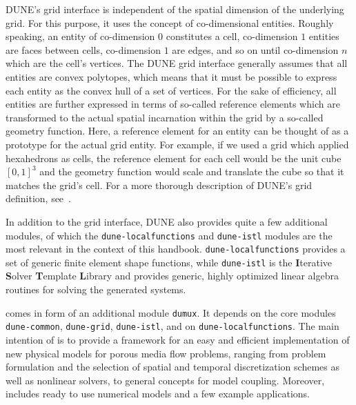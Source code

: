 DUNE's grid interface is independent of the spatial dimension of the
underlying grid. For this purpose, it uses the concept of
co-dimensional entities. Roughly speaking, an entity of co-dimension
$0$ constitutes a cell, co-dimension $1$ entities are faces between
cells, co-dimension $1$ are edges, and so on until co-dimension $n$
which are the cell's vertices.  The DUNE grid interface generally
assumes that all entities are convex polytopes, which means that it
must be possible to express each entity as the convex hull of a set of
vertices. For the sake of efficiency, all entities are further expressed in terms
of so-called reference elements which are transformed to the actual
spatial incarnation within the grid by a so-called geometry
function. Here, a reference element for an
entity can be thought of as a prototype for the actual grid
entity. For example, if we used a grid which applied hexahedrons as cells,
the reference element for each cell would be the unit cube $[0, 1]^3$
and the geometry function would scale and translate the cube so that
it matches the grid's cell. For a more thorough description of DUNE's
grid definition, see~\cite{BASTIAN2008}.

In addition to the grid interface, DUNE also provides quite a few
additional modules, of which the \texttt{dune-localfunctions} and
\texttt{dune-istl} modules are the most relevant in the context of
this handbook. \texttt{dune-localfunctions} provides a set of generic
finite element shape functions, while \texttt{dune-istl} is the
\textbf{I}terative \textbf{S}olver \textbf{T}emplate \textbf{L}ibrary
and provides generic, highly optimized linear algebra routines for
solving the generated systems.

\Dumux comes in form of an additional module \texttt{dumux}. 
It depends on the \Dune core modules 
\texttt{dune-common}, \texttt{dune-grid}, \texttt{dune-istl}, and on \texttt{dune-localfunctions}. 
The main intention of \Dumux is to provide a framework for an easy and efficient 
implementation of new physical models for porous media flow problems, 
ranging from problem formulation and the selection of 
spatial and temporal discretization schemes as well as nonlinear solvers,  
to general concepts for model coupling.  
Moreover, \Dumux includes ready to use numerical models and a few example applications.  

